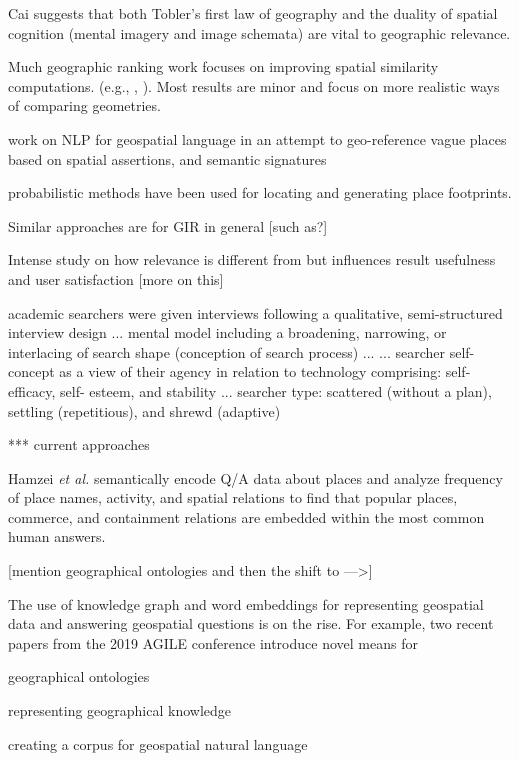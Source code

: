 Cai suggests that both Tobler's first law of geography and the duality of spatial cognition (mental imagery and image schemata) are vital to geographic relevance. \cite{Cai2011}



Much geographic ranking work focuses on improving spatial similarity computations. (e.g., \cite{Larson2004} \cite{Martins2005}, \cite{Markowetz2005}). Most results are minor and focus on more realistic ways of comparing geometries.


work on NLP for geospatial language in an attempt to geo-reference vague places based on spatial assertions, and semantic signatures
\cite{Guo2008} \cite{Liu2009} \cite{Li2012} \cite{Gao2017}

probabilistic methods have been used for locating and generating place footprints. \cite{Jones2008}

Similar approaches are for GIR in general [such as?]

Intense study on how relevance is different from but influences result usefulness and user satisfaction [more on this]
\cite{Mao2016}


\cite{Willson2014}
academic searchers were given interviews following a qualitative, semi-structured interview design
...
mental model including a broadening, narrowing, or interlacing of search shape (conception of search process)
...
... searcher self-concept as a view of their agency in relation to technology comprising: self-efficacy, self- esteem, and stability
...
searcher type: scattered (without a plan), settling (repetitious), and shrewd (adaptive)

***  current approaches



Hamzei \emph{et al.} \cite{Hamzei2019b} semantically encode \acrshort{Q/A} data about places and analyze frequency of place names, activity, and spatial relations to find that popular places, commerce, and containment relations are embedded within the most common human answers.

[mention geographical ontologies and then the shift to --->]

The use of knowledge graph and word embeddings for representing geospatial data and answering geospatial questions is on the rise. For example, two recent papers \cite {Mai2019} \cite{Dassereto2019} from the 2019 AGILE conference introduce novel means for 

geographical ontologies

representing geographical knowledge 



creating a corpus for geospatial natural language \cite{Stock2013}
